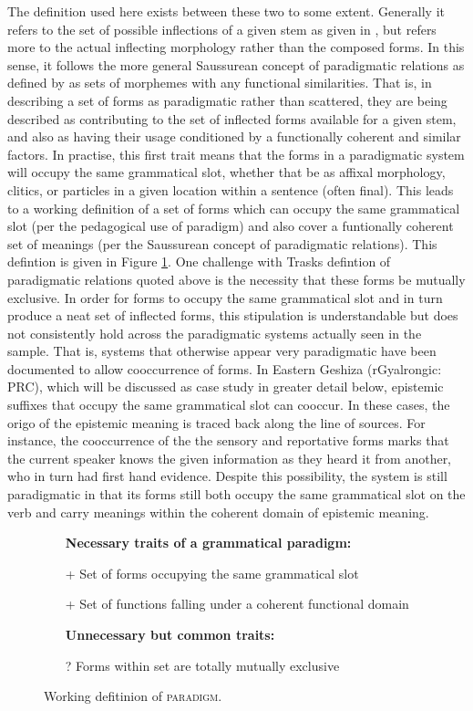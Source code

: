 The definition used here exists between these two to some extent. Generally it refers to the set of possible inflections of a given stem as given in , but refers more to the actual inflecting morphology rather than the composed forms. In this sense, it follows the more general Saussurean concept of paradigmatic relations as defined by  as sets of morphemes with any functional similarities. That is, in describing a set of forms as paradigmatic rather than scattered, they are being described as contributing to the set of inflected forms available for a given stem, and also as having their usage conditioned by a functionally coherent and similar factors. In practise, this first trait means that the forms in a paradigmatic system will occupy the same grammatical slot, whether that be as affixal morphology, clitics, or particles in a given location within a sentence (often final). This leads to a working definition of a set of forms which can occupy the same grammatical slot (per the pedagogical use of paradigm) and also cover a funtionally coherent set of meanings (per the Saussurean concept of paradigmatic relations). This defintion is given in Figure \ref{f:Discussion:Paradigm}. One challenge with Trasks defintion of paradigmatic relations quoted above is the necessity that these forms be mutually exclusive. In order for forms to occupy the same grammatical slot and in turn produce a neat set of inflected forms, this stipulation is understandable but does not consistently hold across the paradigmatic systems actually seen in the sample. That is, systems that otherwise appear very paradigmatic have been documented to allow cooccurrence of forms. In Eastern Geshiza (rGyalrongic: PRC), which will be discussed as case study in greater detail below, epistemic suffixes that occupy the same grammatical slot can cooccur. In these cases, the origo of the epistemic meaning is traced back along the line of sources. For instance, the cooccurrence of the the sensory and reportative forms marks that the current speaker knows the given information as they heard it from another, who in turn had first hand evidence. Despite this possibility, the system is still paradigmatic in that its forms still both occupy the same grammatical slot on the verb and carry meanings within the coherent domain of epistemic meaning.

\begin{figure}
    \begin{itemize}
        \item[] \textbf{Necessary traits of a grammatical paradigm:}
        \item[+] Set of forms occupying the same grammatical slot
        \item[+] Set of functions falling under a coherent functional domain
        \item[] \textbf{Unnecessary but common traits:}
        \item[?] Forms within set are totally mutually exclusive
    \end{itemize}
    \caption{Working defitinion of \textsc{paradigm}.}\label{f:Discussion:Paradigm}
\end{figure}

